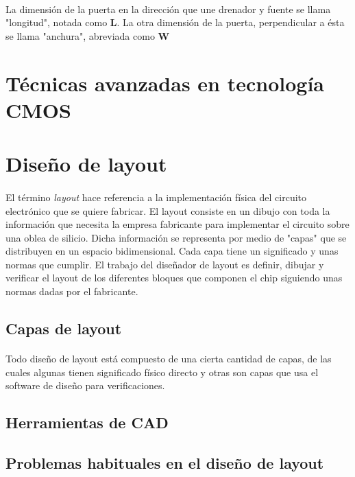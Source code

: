 \paragraph{}
La dimensión de la puerta en la dirección que une drenador y fuente se llama
"longitud", notada como \textbf{L}. La otra dimensión de la puerta, perpendicular a ésta
se llama "anchura", abreviada como \textbf{W}


\section{Técnicas avanzadas en tecnología CMOS}

\section{Diseño de layout}

\paragraph{}
El término \textit{layout} hace referencia a la implementación física del circuito
electrónico que se quiere fabricar. El layout consiste en un dibujo con toda
la información que necesita la empresa fabricante para implementar el circuito
sobre una oblea de silicio. Dicha información se representa por medio de "capas"
que se distribuyen en un espacio bidimensional. Cada capa tiene un significado y
unas normas que cumplir. El trabajo del diseñador de layout es definir, dibujar y
verificar el layout de los diferentes bloques que componen el chip siguiendo
unas normas dadas por el fabricante.

\subsection{Capas de layout}

\paragraph{}
Todo diseño de layout está compuesto de una cierta cantidad de capas, de las cuales
algunas tienen significado físico directo y otras son capas que usa el software de
diseño para verificaciones.

\subsection{Herramientas de CAD}

\subsection{Problemas habituales en el diseño de layout}
